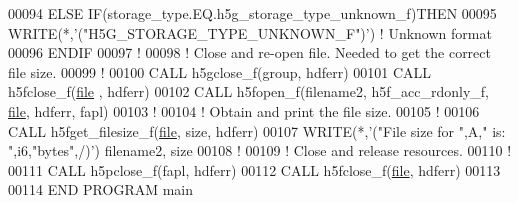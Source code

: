 \begin{DoxyCode}
00094   \textcolor{keywordflow}{ELSE} \textcolor{keywordflow}{IF}(storage\_type.EQ.h5g\_storage\_type\_unknown\_f)\textcolor{keywordflow}{THEN}
00095      \textcolor{keyword}{WRITE}(*,\textcolor{stringliteral}{'("H5G\_STORAGE\_TYPE\_UNKNOWN\_F")'}) \textcolor{comment}{! Unknown format}
00096 \textcolor{keywordflow}{  ENDIF}
00097   \textcolor{comment}{!}
00098   \textcolor{comment}{! Close and re-open file.  Needed to get the correct file size.}
00099   \textcolor{comment}{!}
00100   \textcolor{keyword}{CALL }h5gclose\_f(group, hdferr)
00101   \textcolor{keyword}{CALL }h5fclose\_f(\hyperlink{structfile}{file} , hdferr)
00102   \textcolor{keyword}{CALL }h5fopen\_f(filename2, h5f\_acc\_rdonly\_f, \hyperlink{structfile}{file}, hdferr, fapl)
00103   \textcolor{comment}{!}
00104   \textcolor{comment}{! Obtain and print the file size.}
00105   \textcolor{comment}{!}
00106   \textcolor{keyword}{CALL }h5fget\_filesize\_f(\hyperlink{structfile}{file}, \textcolor{keyword}{size}, hdferr)
00107   \textcolor{keyword}{WRITE}(*,\textcolor{stringliteral}{'("File size for ",A," is: ",i6,"bytes",/)'}) filename2, \textcolor{keyword}{size}
00108   \textcolor{comment}{!}
00109   \textcolor{comment}{! Close and release resources.}
00110   \textcolor{comment}{!}
00111   \textcolor{keyword}{CALL }h5pclose\_f(fapl, hdferr)
00112   \textcolor{keyword}{CALL }h5fclose\_f(\hyperlink{structfile}{file}, hdferr)
00113 
00114 \textcolor{keyword}{END PROGRAM }main
\end{DoxyCode}
